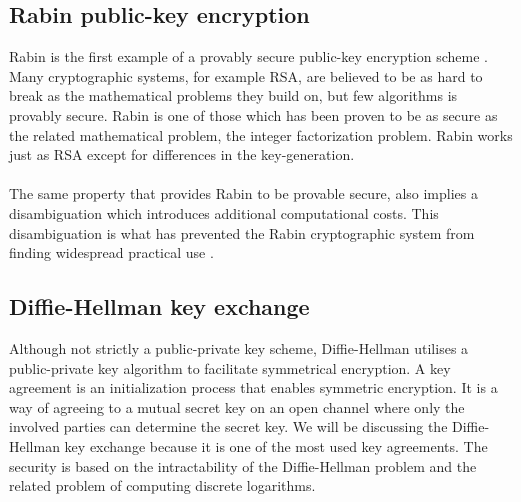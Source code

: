 \documentclass[frame, english]{idamasterthesis}
\begin{document}
\subsection{Rabin public-key encryption} 
Rabin is the first example of a provably secure public-key encryption scheme \cite{rabinorig}. Many cryptographic systems, for example RSA, are believed to be as hard to break as the mathematical problems they build on, but few algorithms is provably secure. Rabin is one of those which has been proven to be as secure as the related mathematical problem, the integer factorization problem. Rabin works just as RSA except for differences in the key-generation. \\\\
The same property that provides Rabin to be provable secure, also implies a disambiguation which introduces additional computational costs. This disambiguation is what has prevented the Rabin cryptographic system from finding widespread practical use \cite{handcrypt}.

\subsection{Diffie-Hellman key exchange}
Although not strictly a public-private key scheme, Diffie-Hellman utilises a public-private key algorithm to facilitate symmetrical encryption.
A key agreement is an initialization process that enables symmetric encryption. It is a way of agreeing to a mutual secret key on an open channel where only the involved parties can determine the secret key. We will be discussing the Diffie-Hellman key exchange because it is one of the most used key agreements. The security is based on the intractability of the Diffie-Hellman problem and the related problem of computing discrete logarithms.
\end{document}
